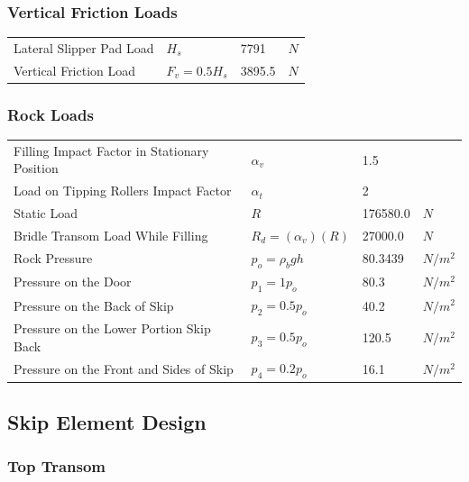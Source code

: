 \documentclass{article}%
\begin{document}
%
\subsubsection{Vertical Friction Loads}%
\label{ssubsec:VerticalFrictionLoads}%
\begin{flushleft}%
\begin{minipage}{\textwidth}%
\flushleft%
\begin{tabular}{l l l l}%
Lateral Slipper Pad Load&$H_s$&7791&$N$\\%
Vertical Friction Load&$F_v = 0.5 H_s$&3895.5&$N$\\%
\end{tabular}%
\end{minipage}%
\end{flushleft}

%
\subsubsection{Rock Loads}%
\label{ssubsec:RockLoads}%
\begin{flushleft}%
\begin{minipage}{\textwidth}%
\flushleft%
\begin{tabular}{l l l l}%
Filling Impact Factor in Stationary Position&$\alpha_v$&1.5&\\%
Load on Tipping Rollers Impact Factor&$\alpha_t$&2&\\%
Static Load&$R$&176580.0&$N$\\%
Bridle Transom Load While Filling&$R_d = (\alpha_v)(R)$&27000.0&$N$\\%
Rock Pressure&$p_o = \rho_b g h$&80.3439&$N/m^2$\\%
Pressure on the Door&$p_1 = 1 p_o$&80.3&$N/m^2$\\%
Pressure on the Back of Skip&$p_2 = 0.5 p_o$&40.2&$N/m^2$\\%
Pressure on the Lower Portion Skip Back&$p_3 = 0.5 p_o$&120.5&$N/m^2$\\%
Pressure on the Front and Sides of Skip&$p_4 = 0.2 p_o$&16.1&$N/m^2$\\%
\end{tabular}%
\end{minipage}%
\end{flushleft}

%
\subsection{Skip Element Design}%
\label{subsec:SkipElementDesign}%
\subsubsection{Top Transom}%
\label{ssubsec:TopTransom}%
\end{document}
